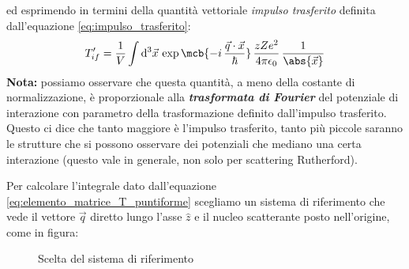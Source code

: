 ed esprimendo in termini della quantità vettoriale \textit{impulso trasferito}
definita dall'equazione \ref{eq:impulso_trasferito}:
\begin{equation}
  T_{if}^\prime = \frac{1}{V} \int \mathrm{d}^3\vec{x} \, \exp\mcb{-i \,
  \frac{\vec{q}\cdot\vec{x}}{\hbar}} \, \frac{zZe^2}{4\pi\epsilon_0} \,
  \frac{1}{\abs{\vec{x}}}
  \label{eq:elemento_matrice_T_puntiforme}
\end{equation}
\textbf{Nota:} possiamo osservare che questa quantità, a meno della costante di
normalizzazione, è proporzionale alla \textit{\textbf{trasformata di Fourier}}
del potenziale di interazione con parametro della trasformazione definito
dall'impulso trasferito.
Questo ci dice che tanto maggiore è l'impulso trasferito, tanto più piccole
saranno le strutture che si possono osservare dei potenziali che mediano una
certa interazione (questo vale in generale, non solo per scattering
Rutherford).

Per calcolare l'integrale dato dall'equazione
\ref{eq:elemento_matrice_T_puntiforme} scegliamo un sistema di riferimento che
vede il vettore $\vec{q}$ diretto lungo l'asse $\hat{z}$ e il nucleo
scatterante posto nell'origine, come in figura:

\begin{figure}[ht]
  \centering
  \caption{Scelta del sistema di riferimento}
  \label{fig:sistema_riferimento}
\end{figure}

